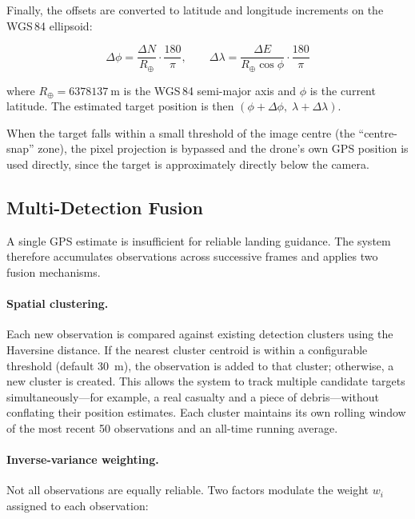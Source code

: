 \noindent Finally, the offsets are converted to latitude and longitude increments on the WGS\,84 ellipsoid:

\begin{equation}\label{eq:gps-offset}
  \Delta\phi = \frac{\Delta N}{R_\oplus}\cdot\frac{180}{\pi}, \qquad
  \Delta\lambda = \frac{\Delta E}{R_\oplus \cos\phi}\cdot\frac{180}{\pi}
\end{equation}

\noindent where $R_\oplus = \SI{6378137}{\metre}$ is the WGS\,84 semi-major axis and $\phi$ is the current latitude. The estimated target position is then $(\phi + \Delta\phi,\; \lambda + \Delta\lambda)$.

When the target falls within a small threshold of the image centre (the ``centre-snap'' zone), the pixel projection is bypassed and the drone's own GPS position is used directly, since the target is approximately directly below the camera.

\subsection{Multi-Detection Fusion}\label{sec:fusion}

A single GPS estimate is insufficient for reliable landing guidance. The system therefore accumulates observations across successive frames and applies two fusion mechanisms.

\paragraph{Spatial clustering.}
Each new observation is compared against existing detection clusters using the Haversine distance. If the nearest cluster centroid is within a configurable threshold (default \SI{30}{\metre}), the observation is added to that cluster; otherwise, a new cluster is created. This allows the system to track multiple candidate targets simultaneously---for example, a real casualty and a piece of debris---without conflating their position estimates. Each cluster maintains its own rolling window of the most recent 50 observations and an all-time running average.

\paragraph{Inverse-variance weighting.}
Not all observations are equally reliable. Two factors modulate the weight $w_i$ assigned to each observation:

